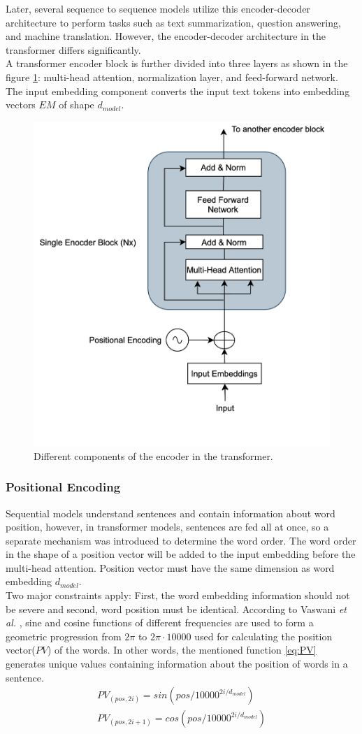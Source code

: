 \documentclass[%
	BCOR=8mm, %
	DIV=12,
	toc=bibliography, %
	toc=listof, %
	oneside, %
	egregdoesnotlikesansseriftitles, %
	]{scrbook}
\begin{document}
 Later, several sequence to sequence models utilize this encoder-decoder architecture to perform tasks such as text summarization, question answering, and machine translation. However, the encoder-decoder architecture in the transformer differs significantly.\\
A transformer encoder block is further divided into three layers as shown in the figure \ref{diag:EncoderArch}: multi-head attention, normalization layer, and feed-forward network. The input embedding component converts the input text tokens into embedding vectors $EM$ of shape $d_{model}$.
\begin{figure}[H]
\centering
\includegraphics[width=.50\textwidth]{img/EncoderArch.png}
\caption[Different components of an encoder in transformer]{Different components of the encoder in the transformer.}
\label{diag:EncoderArch}
\end{figure}
\subsubsection{Positional Encoding}
Sequential models understand sentences and contain information about word position, however, in transformer models, sentences are fed all at once, so a separate mechanism was introduced to determine the word order. The word order in the shape of a position vector will be added to the input embedding before the multi-head attention. Position vector must have the same dimension as word embedding $d_{model}$.\\
Two major constraints apply: First, the word embedding information should not be severe and second, word position must be identical. According to Vaswani \textit{et al.} \cite{vaswani_attention_2017}, sine and cosine functions of different frequencies are used to form a geometric progression from  $2\pi$ to $2\pi \cdot 10000$ used for calculating the position vector($PV$) of the words. In other words, the mentioned function \ref{eq:PV} generates unique values containing information about the position of words in a sentence.
\begin{equation}
\begin{aligned}
    PV_{(pos,2i)}=sin(pos/10000^{2i/d_{model}})\\
    PV_{(pos,2i+1)}=cos(pos/10000^{2i/d_{model}})
    \label{eq:PV}
\end{aligned}
\end{equation}
\end{document}
